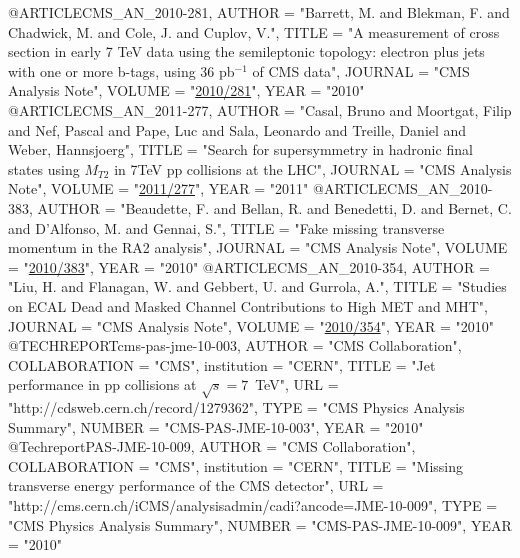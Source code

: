 @ARTICLE{CMS_AN_2010-281,
     AUTHOR       = "Barrett, M. and Blekman, F. and Chadwick, M. and Cole, J. and Cuplov, V.",
     TITLE        = "A measurement of \ttbar cross section in early 7 TeV data using the semileptonic topology: electron plus jets with one or more b-tags, using 36 pb$^{-1}$ of CMS data",
     JOURNAL      = "CMS Analysis Note",
     VOLUME       = "\href{http://cms.cern.ch/iCMS/jsp/db_notes/noteInfo.jsp?cmsnoteid=CMS\%20AN-2010/281}{2010/281}",
     YEAR         = "2010"
}
@ARTICLE{CMS_AN_2011-277,
     AUTHOR       = "Casal, Bruno and Moortgat, Filip and Nef, Pascal and Pape, Luc and Sala, Leonardo and Treille, Daniel and Weber, Hannsjoerg",
     TITLE        = "Search for supersymmetry in hadronic final states using $M_{T2}$ in 7TeV pp collisions at the LHC",
     JOURNAL      = "CMS Analysis Note",
     VOLUME       = "\href{http://cms.cern.ch/iCMS/jsp/db_notes/noteInfo.jsp?cmsnoteid=CMS\%20AN-2011/277}{2011/277}",
     YEAR         = "2011"
}
@ARTICLE{CMS_AN_2010-383,
     AUTHOR       = "Beaudette, F. and Bellan, R. and Benedetti, D. and Bernet, C. and D'Alfonso, M. and Gennai, S.",
     TITLE        = "Fake missing transverse momentum in the RA2 analysis",
     JOURNAL      = "CMS Analysis Note",
     VOLUME       = "\href{http://cms.cern.ch/iCMS/jsp/db_notes/noteInfo.jsp?cmsnoteid=CMS\%20AN-2010/383}{2010/383}",
     YEAR         = "2010"
}
@ARTICLE{CMS_AN_2010-354,
     AUTHOR       = "Liu, H. and Flanagan, W. and Gebbert, U. and Gurrola, A.",
     TITLE        = "Studies on ECAL Dead and Masked Channel Contributions to High MET and MHT",
     JOURNAL      = "CMS Analysis Note",
     VOLUME       = "\href{http://cms.cern.ch/iCMS/jsp/db_notes/noteInfo.jsp?cmsnoteid=CMS\%20AN-2010/354}{2010/354}",
     YEAR         = "2010"
}
@TECHREPORT{cms-pas-jme-10-003,
  AUTHOR      = "{CMS Collaboration}",
  COLLABORATION = "CMS",
  institution    = "CERN",
  TITLE       = "Jet performance in pp collisions at $\sqrt{s}=7$~TeV",
  URL         = "http://cdsweb.cern.ch/record/1279362",
  TYPE        = "CMS Physics Analysis Summary",
  NUMBER      = "CMS-PAS-JME-10-003",
  YEAR        = "2010"
}
@Techreport{PAS-JME-10-009,
      AUTHOR      = "{CMS Collaboration}",
      COLLABORATION = "{CMS}",
      institution    = "CERN",
      TITLE       = "Missing transverse energy performance of the CMS detector",
      URL         = "http://cms.cern.ch/iCMS/analysisadmin/cadi?ancode=JME-10-009",
      TYPE        = "CMS Physics Analysis Summary",
      NUMBER      = "CMS-PAS-JME-10-009",
      YEAR        = "2010"
}
